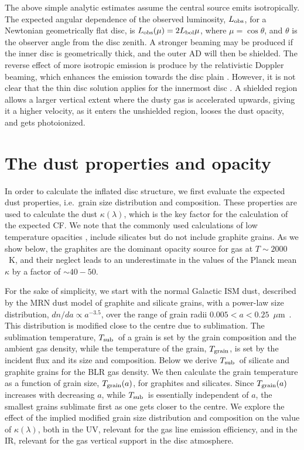 \documentclass[a4paper,fleqn,usenatbib]{mnras}
\newcommand{\mic}{\mbox{$\mu$m}}
\newcommand{\Tsub}{\mbox{$T_{\rm sub}$}}
\newcommand{\Tgr}{\mbox{$T_{\rm grain}$}}
\begin{document}
The above simple analytic estimates assume the central source emits isotropically. 
The expected angular dependence of the observed luminosity, $L_{\rm obs}$, for a Newtonian geometrically 
flat disc, is $L_{\rm obs}(\mu)=2L_{\rm bol}\mu$, where $\mu=\cos\theta$, and $\theta$ is the observer angle from the 
disc zenith. A stronger beaming may be produced if the inner disc is geometrically thick, and the outer AD
will then be shielded. The reverse effect of more isotropic emission
is produce by the relativistic Doppler beaming, which enhances the emission towards the disc plain
\citep{LaorNetzer89}. However, it is not clear that the thin disc solution applies for the innermost disc
\citep{LaorDavis14}. A shielded region allows a larger vertical extent where the dusty gas is accelerated upwards,
giving it a higher velocity, as it enters the unshielded region, looses the dust opacity, and 
gets photoionized. 



\section{The dust properties and opacity} \label{sec:dust_prop}

In order to calculate the inflated disc structure, we first evaluate the expected dust properties,
i.e.\ grain size distribution and composition. These properties are used to calculate the dust $\kappa(\lambda)$, 
which is the key factor for the calculation of the expected CF. We note that the commonly used 
calculations of low temperature opacities \citep{Semenov03, Ferguson05}, include silicates but do
not include graphite grains. As we show below, the graphites are the dominant opacity source for
gas at $T\sim 2000$~K, and their neglect leads to an underestimate in the values of the Planck mean $\kappa$
by a factor of $\sim 40-50$.
	
For the sake of simplicity, we start with the normal Galactic ISM dust, described by the MRN dust model of graphite 
and silicate
grains, with a power-law size distribution, $dn/da\propto a^{-3.5}$, 
over the range of grain radii $0.005<a<0.25$~\mic\ \citep*{MRN77}. This distribution is modified close to the centre due to sublimation. The sublimation temperature, \Tsub\,
of a grain is set by the grain composition
and the ambient gas density, while the temperature of the grain, \Tgr, is set by the incident flux and its size and composition. 
Below we derive \Tsub\ of silicate and graphite grains 
for the BLR gas density. 
We then calculate the grain temperature as a function
of grain size, $\Tgr(a)$, for graphites and silicates. Since $\Tgr(a)$ increases with decreasing $a$,
while \Tsub\ is essentially independent of $a$,
the smallest grains sublimate first as one gets closer to the centre. We explore the effect of the implied modified grain size distribution
and composition on the value of $\kappa(\lambda)$, both in the UV, relevant for the gas line emission efficiency, 
and in the 
IR, relevant for the gas vertical support in the disc atmosphere. 
\end{document}
